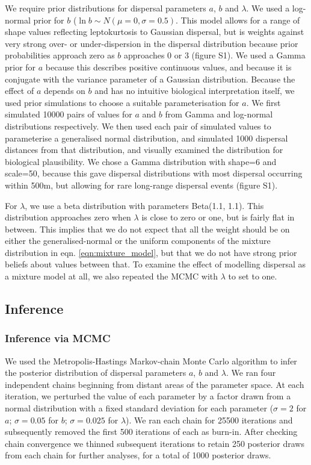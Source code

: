 \documentclass[10pt, a4paper, twocolumn]{article} %
\begin{document}
We require prior distributions for dispersal parameters $a$, $b$ and $\lambda$.
We used a log-normal prior for $b$ ($\ln b \sim N(\mu=0, \sigma = 0.5)$.
This model allows for a range of shape values reflecting leptokurtosis to Gaussian dispersal, but is weights against very strong over- or under-dispersion in the dispersal distribution because prior probabilities approach zero as $b$ approaches 0 or 3 (figure S1).
We used a Gamma prior for $a$ because this describes positive continuous values, and because it is conjugate with the variance parameter of a Gaussian distribution.
Because the effect of $a$ depends on $b$ and has no intuitive biological interpretation itself, we used prior simulations to choose a suitable parameterisation for $a$. We first simulated 10000 pairs of values for $a$ and $b$ from Gamma and log-normal distributions respectively. We then used each pair of simulated values to parameterise a generalised normal distribution, and simulated 1000 dispersal distances from that distribution, and visually examined the distribution for biological plausibility. We chose a Gamma distribution with shape=6 and scale=50, because this gave dispersal distributions with most dispersal occurring within 500m, but allowing for rare long-range dispersal events (figure S1).

For $\lambda$, we use a beta distribution with parameters Beta(1.1, 1.1).
This distribution approaches zero when $\lambda$ is close to zero or one, but is fairly flat in between.
This implies that we do not expect that all the weight should be on either the generalised-normal or the uniform components of the mixture distribution in eqn. \ref{eqn:mixture_model}, but that we do not have strong prior beliefs about values between that.
To examine the effect of modelling dispersal as a mixture model at all, we also repeated the MCMC with $\lambda$ to set to one.

\subsection{Inference}

\subsubsection{Inference via MCMC}

We used the Metropolis-Hastings Markov-chain Monte Carlo algorithm to infer the posterior distribution of dispersal parameters $a$, $b$ and $\lambda$.
We ran four independent chains beginning from distant areas of the parameter space.
At each iteration, we perturbed the value of each parameter by a factor drawn from a normal distribution with a fixed standard deviation for each parameter ($\sigma= 2$ for $a$; $\sigma= 0.05$ for $b$; $\sigma= 0.025$ for $\lambda$).
We ran each chain for 25500 iterations and subsequently removed the first 500 iterations of each as burn-in.
After checking chain convergence we thinned subsequent iterations to retain 250 posterior draws from each chain for further analyses, for a total of 1000 posterior draws.
\end{document}
